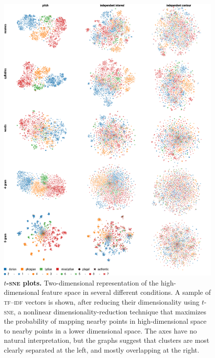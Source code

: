 \documentclass{article}
\begin{document}
\begin{figure}
    \centering
    \includegraphics{figs/figS10-tSNE-embeddings.pdf}
    \caption{
        \textbf{$t$-\textsc{sne} plots.}
        Two-dimensional representation of the high-dimensional feature space
        in several different conditions.
        A sample of \textsc{tf--idf} vectors is shown, after reducing their dimensionality using $t$-\textsc{sne}, a nonlinear dimensionality-reduction technique that maximizes the probability of mapping nearby points in high-dimensional space to nearby points in a lower dimensional space. The axes have no natural interpretation, but the graphs suggest that clusters are most clearly separated at the left, and mostly overlapping at the right.
        \label{suppl:t-sne-plots}
    }
\end{figure}
\end{document}
